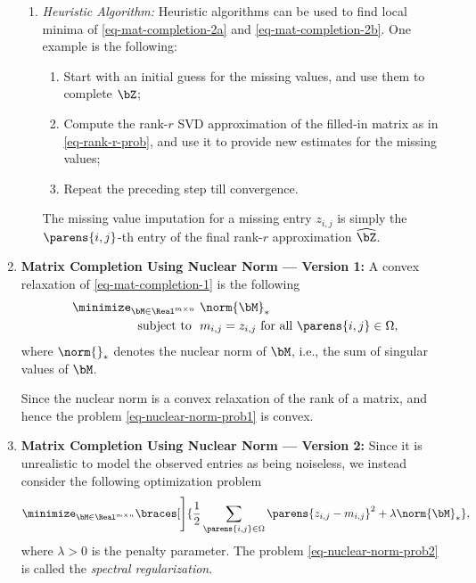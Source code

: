 \documentclass[12pt]{article}
\begin{document}
\begin{enumerate}[label=\textbf{\arabic*.}]
\begin{enumerate}
		\item \textit{Heuristic Algorithm:} Heuristic algorithms can be used to find local minima of \eqref{eq-mat-completion-2a} and \eqref{eq-mat-completion-2b}. One example is the following: 
		\begin{enumerate}
			\item Start with an initial guess for the missing values, and use them to complete $\bZ$; 
			\item Compute the rank-$r$ SVD approximation of the filled-in matrix as in \eqref{eq-rank-r-prob}, and use it to provide new estimates for the missing values; 
			\item Repeat the preceding step till convergence. 
		\end{enumerate}
		The missing value imputation for a missing entry $z_{i,j}$ is simply the $\parens{i, j}$-th entry of the final rank-$r$ approximation $\widehat{\bZ}$. 
	\end{enumerate}
	
	\item \textbf{Matrix Completion Using Nuclear Norm --- Version 1:} A convex relaxation of \eqref{eq-mat-completion-1} is the following 
	\begin{equation}\label{eq-nuclear-norm-prob1}
		\begin{aligned}
			\minimize_{\bM \in \Real^{m \times n}} & \ \norm{\bM}_* \\ 
			\text{ subject to } & \ m_{i,j} = z_{i,j} \text{ for all } \parens{i, j} \in \Omega, 
		\end{aligned}
	\end{equation}
	where $\norm{}_*$ denotes the nuclear norm of $\bM$, i.e., the sum of singular values of $\bM$. 
	
	Since the nuclear norm is a convex relaxation of the rank of a matrix, and hence the problem \eqref{eq-nuclear-norm-prob1} is convex. 
	
	\item \textbf{Matrix Completion Using Nuclear Norm --- Version 2:} Since it is unrealistic to model the observed entries as being noiseless, we instead consider the following optimization problem 
	\begin{equation}\label{eq-nuclear-norm-prob2}
		\begin{aligned}
			\minimize_{\bM \in \Real^{m \times n}} \braces[\Bigg]{\frac{1}{2} \sum_{\parens{i,j} \in \Omega} \parens{z_{i,j} - m_{i,j}}^2 + \lambda \norm{\bM}_*}, 
		\end{aligned}
	\end{equation}
	where $\lambda > 0$ is the penalty parameter. The problem \eqref{eq-nuclear-norm-prob2} is called the \emph{spectral regularization}. 
	

\end{enumerate}
\end{document}
